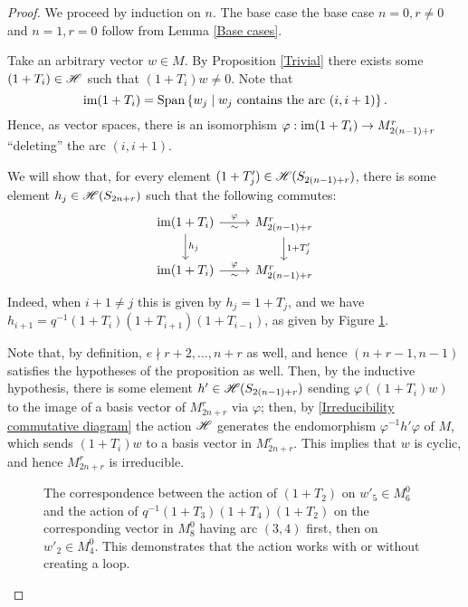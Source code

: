 \documentclass{amsart}
\begin{document}
\begin{proof}
  We proceed by induction on $n$.
  The base case the base case $n = 0, r \neq 0$ and $n = 1, r = 0$ follow from Lemma \ref{Base cases}.

  Take an arbitrary vector $w \in M$.
  By Proposition \ref{Trivial} there exists some $(1 + T_i) \in \mathscr{H}$ such that $(1 + T_i)w \neq 0$.
  Note that \[\operatorname{im} (1 + T_i) = \operatorname{Span}\left\{ w_j \mid w_j \text{ contains the arc }(i,i+1) \right\}.\]
  Hence, as vector spaces, there is an isomorphism $\varphi:\operatorname{im}(1 + T_i) \rightarrow M_{2(n-1) + r}^r$ ``deleting'' the arc $(i,i+1)$.

  We will show that, for every element $(1 + T_j') \in \mathscr{H}(S_{2(n-1) + r})$, there is some element $h_j \in \mathscr{H}(S_{2n + r})$ such that the following commutes:
  \begin{equation}\label{Irreducibility commutative diagram}
    \begin{tikzcd}
      \ima (1 + T_i) \arrow[r,"\varphi" above, "\sim" below] \arrow[d,"h_j"] & M_{2(n-1) + r}^r \arrow[d,"1 + T_j'"]\\
      \ima (1 + T_i) \arrow[r,"\varphi" above, "\sim" below] & M_{2(n-1) + r}^r
    \end{tikzcd}
  \end{equation}
  Indeed, when $i+1 \neq j$ this is given by $h_j = 1 + T_j$, and we have $h_{i+1} = q^{-1}(1 + T_i)(1 + T_{i+1})(1 + T_{i-1})$, as given by Figure \ref{bigloop}.
  
  Note that, by definition, $e \nmid r+2,\dots,n+r$ as well, and hence $(n+r-1,n-1)$ satisfies the hypotheses of the proposition as well.
  Then, by the inductive hypothesis, there is some element $h' \in \mathscr{H}(S_{2(n-1) + r})$ sending $\varphi((1 + T_i)w)$ to the image of a basis vector of $M_{2n + r}^r$ via $\varphi$;
  then, by \eqref{Irreducibility commutative diagram} the action $\mathscr{H}$ generates the endomorphism $\varphi^{-1}h'\varphi$ of $M$, which sends $(1 + T_i)w$ to a basis vector in $M_{2n + r}^r$.
  This implies that $w$ is cyclic, and hence $M_{2n + r}^r$ is irreducible.
  \begin{figure}
  \begin{adjustbox}{width=\textwidth}
     \hspace{20pt} 
  \end{adjustbox}
  \begin{adjustbox}{width=\textwidth}
     \hspace{20pt}
\end{adjustbox}
  \caption{The correspondence between the action of $(1 + T_2)$ on $w'_5 \in M^0_6$ and the action of $q^{-1}(1 + T_3)(1 + T_4)(1 + T_2)$ on the corresponding vector in $M^0_8$ having arc $(3,4)$ first, then on $w'_2 \in M^0_4$.
  This demonstrates that the action works with or without creating a loop.
  }
  \label{bigloop}
  \end{figure}
\end{proof}
\end{document}
